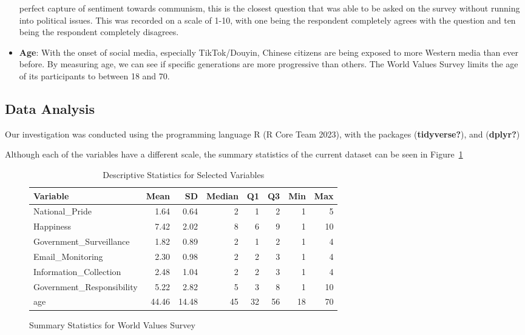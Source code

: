 \documentclass[
  letterpaper,
  DIV=11,
  numbers=noendperiod]{scrartcl}
\begin{document}
\begin{itemize}
  perfect capture of sentiment towards communism, this is the closest
  question that was able to be asked on the survey without running into
  political issues. This was recorded on a scale of 1-10, with one being
  the respondent completely agrees with the question and ten being the
  respondent completely disagrees.
\item
  \textbf{Age}: With the onset of social media, especially
  TikTok/Douyin, Chinese citizens are being exposed to more Western
  media than ever before. By measuring age, we can see if specific
  generations are more progressive than others. The World Values Survey
  limits the age of its participants to between 18 and 70.
\end{itemize}

\hypertarget{data-analysis}{%
\subsection{Data Analysis}\label{data-analysis}}

Our investigation was conducted using the programming language R (R Core
Team 2023), with the packages (\textbf{tidyverse?}), and
(\textbf{dplyr?})

Although each of the variables have a different scale, the summary
statistics of the current dataset can be seen in
Figure~\ref{fig-summary}

\begin{figure}

{\centering 

\hypertarget{fig-summary-1}{}
\begin{table}

\caption{Descriptive Statistics for Selected Variables}
\centering
\begin{tabular}[t]{lrrrrrrr}
\toprule
\textbf{Variable} & \textbf{Mean} & \textbf{SD} & \textbf{Median} & \textbf{Q1} & \textbf{Q3} & \textbf{Min} & \textbf{Max}\\
\midrule
National\_Pride & 1.64 & 0.64 & 2 & 1 & 2 & 1 & 5\\
Happiness & 7.42 & 2.02 & 8 & 6 & 9 & 1 & 10\\
Government\_Surveillance & 1.82 & 0.89 & 2 & 1 & 2 & 1 & 4\\
Email\_Monitoring & 2.30 & 0.98 & 2 & 2 & 3 & 1 & 4\\
Information\_Collection & 2.48 & 1.04 & 2 & 2 & 3 & 1 & 4\\
\addlinespace
Government\_Responsibility & 5.22 & 2.82 & 5 & 3 & 8 & 1 & 10\\
age & 44.46 & 14.48 & 45 & 32 & 56 & 18 & 70\\
\bottomrule
\end{tabular}
\end{table}

}

\caption{\label{fig-summary}Summary Statistics for World Values Survey}

\end{figure}
\end{document}
